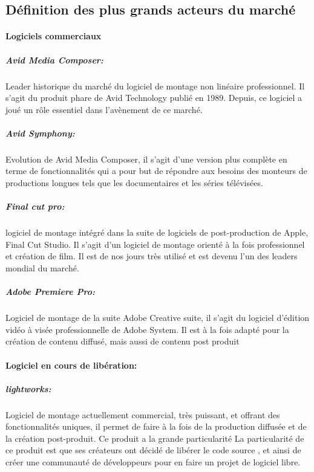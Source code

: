 \subsection{Définition des plus grands acteurs du marché}

\paragraph {Logiciels commerciaux}

\subparagraph{Avid Media Composer:}

Leader historique du marché du logiciel de montage non linéaire
professionnel. Il s'agit du produit phare de Avid Technology publié en
1989. Depuis, ce logiciel a joué un rôle essentiel dans l'avènement
de ce marché.

\subparagraph{Avid Symphony:}

Evolution de Avid Media Composer, il s'agit d'une version plus complète
en terme de fonctionnalités qui a pour but de répondre aux besoins
des monteurs de productions longues tels que les documentaires et les
séries télévisées.

\subparagraph{Final cut pro:}

logiciel de montage intégré dans la suite de logiciels de
post-production de Apple, Final Cut Studio. Il s'agit d'un logiciel
de montage orienté à la fois professionnel et création de film. Il
est de nos jours très utilisé et est devenu l'un des leaders mondial
du marché.

\subparagraph{Adobe Premiere Pro:}

Logiciel de montage de la suite Adobe Creative suite, il s'agit du
logiciel d'édition vidéo à visée professionnelle de Adobe System. Il
est à la fois adapté pour la création de contenu diffusé, mais aussi
de contenu post produit

\paragraph {Logiciel en cours de libération:}

\subparagraph{lightworks:}

Logiciel de montage actuellement commercial, très puissant,
et offrant des fonctionnalités uniques, il permet de faire à la
fois de la production diffusée et de la création post-produit. Ce
produit a la grande particularité La particularité de ce produit
est que ses créateurs ont décidé de libérer le code source
\cite{TheLightworksOpenSourceProjectStartHere}, et ainsi  de créer une
communauté de développeurs pour en faire un projet de logiciel libre.


